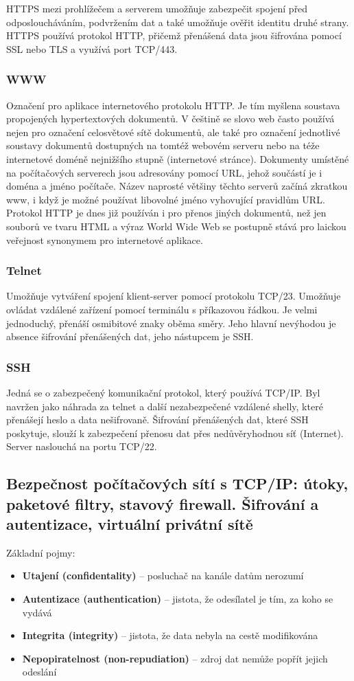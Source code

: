 HTTPS mezi prohlížečem a serverem umožňuje zabezpečit spojení před odposloucháváním, podvržením dat a také umožňuje ověřit identitu druhé strany. HTTPS používá protokol HTTP, přičemž přenášená data jsou šifrována pomocí SSL nebo TLS a využívá port TCP/443.
\subsubsection{WWW}
Označení pro aplikace internetového protokolu HTTP. Je tím myšlena soustava propojených hypertextových dokumentů.
V češtině se slovo web často používá nejen pro označení celosvětové sítě dokumentů, ale také pro označení jednotlivé soustavy dokumentů dostupných na tomtéž webovém serveru nebo na téže internetové doméně nejnižšího stupně (internetové stránce).
Dokumenty umístěné na počítačových serverech jsou adresovány pomocí URL, jehož součástí je i doména a jméno počítače. Název naprosté většiny těchto serverů začíná zkratkou www, i když je možné používat libovolné jméno vyhovující pravidlům URL. Protokol HTTP je dnes již používán i pro přenos jiných dokumentů, než jen souborů ve tvaru HTML a výraz World Wide Web se postupně stává pro laickou veřejnost synonymem pro internetové aplikace.

\subsubsection{Telnet}
Umožňuje vytváření spojení klient-server pomocí protokolu TCP/23. Umožňuje ovládat vzdálené zařízení pomocí terminálu s příkazovou řádkou. Je velmi jednoduchý, přenáší osmibitové znaky oběma směry. Jeho hlavní nevýhodou je absence šifrování přenášených dat, jeho nástupcem je SSH.

\subsubsection{SSH}
Jedná se o zabezpečený komunikační protokol, který používá TCP/IP. Byl navržen jako náhrada za telnet a další nezabezpečené vzdálené shelly, které přenášejí heslo a data nešifrovaně. Šifrování přenášených dat, které SSH poskytuje, slouží k zabezpečení přenosu dat přes nedůvěryhodnou síť (Internet). Server naslouchá na portu TCP/22.
\subsection[Bezpečnost v sítích]{Bezpečnost počítačových sítí s TCP/IP: útoky, paketové filtry, stavový firewall. Šifrování a autentizace, virtuální privátní sítě}
Základní pojmy:
\begin{itemize}
\item \textbf{Utajení (confidentality)} -- posluchač na kanále datům nerozumí
\item \textbf{Autentizace (authentication)} -- jistota, že odesílatel je tím, za koho se vydává 
\item \textbf{Integrita (integrity)} -- jistota, že data nebyla na cestě modifikována 
\item \textbf{Nepopiratelnost (non-repudiation)} -- zdroj dat nemůže popřít jejich odeslání
\end{itemize}

